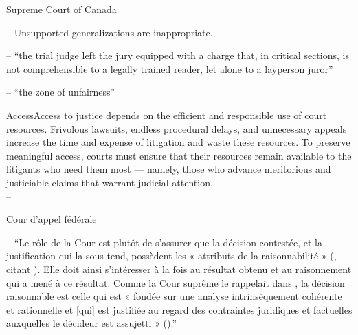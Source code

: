 


\p Supreme Court of Canada

-- Unsupported generalizations are inappropriate.

-- ``the trial judge left the jury equipped with a charge that, in critical sections, is not comprehensible to a legally trained reader, let alone to a layperson juror''

-- ``the zone of unfairness''

\begin{casequote}{Access}Access to justice depends on the efficient and responsible use of court resources. Frivolous lawsuits, endless procedural delays, and unnecessary appeals increase the time and expense of litigation and waste these resources. To preserve meaningful access, courts must ensure that their resources remain available to the litigants who need them most — namely, those who advance meritorious and justiciable claims that warrant judicial attention. \\[0.8\baselineskip]
-- 
\end{casequote}

\p 	Cour d'appel fédérale

-- \enquote{Le rôle de la Cour est plutôt de s’assurer que la décision contestée, et la justification qui la sous-tend, possèdent les « attributs de la raisonnabilité » (, citant ). Elle doit ainsi s’intéresser à la fois au résultat obtenu et au raisonnement qui a mené à ce résultat. Comme la Cour suprême le rappelait dans , la décision raisonnable est celle qui est « fondée sur une analyse intrinsèquement cohérente et rationnelle et [qui] est justifiée au regard des contraintes juridiques et factuelles auxquelles le décideur est assujetti » ().} 






\printbibliographymcgill

